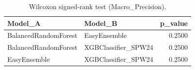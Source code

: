 \begin{table}[t]
\centering
\begin{tabular}{llr}
\toprule
Model_A & Model_B & p_value \\
\midrule
BalancedRandomForest & EasyEnsemble & 0.2500 \\
BalancedRandomForest & XGBClassifier_SPW24 & 0.2500 \\
EasyEnsemble & XGBClassifier_SPW24 & 0.2500 \\
\bottomrule
\end{tabular}
\caption{Wilcoxon signed-rank test (Macro_Precision).}
\label{tab:wilcoxon_Macro_Precision}
\end{table}